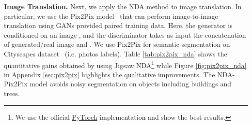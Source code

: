 \documentclass{article} \usepackage{iclr2021_conference,times}
\begin{document}
\textbf{Image Translation.} Next, we apply the NDA method to image translation. In particular, we use the Pix2Pix model~\citep{isola2017image} that can perform image-to-image translation using GANs provided paired training data. Here, the generator is conditioned on an image , and the discriminator takes as input the concatenation of generated/real image and .
We use Pix2Pix for semantic segmentation on Cityscapes dataset~\citep{cordts2016cityscapes} (i.e. photos  labels). Table \ref{tab:pix2pix_nda} shows the quantitative gains obtained by using Jigsaw NDA\footnote{We use the official \href{https://github.com/junyanz/pytorch-CycleGAN-and-pix2pix}{PyTorch} implementation and show the best results. } 
while Figure \ref{fig:pix2pix_nda} in Appendix \ref{sec:pix2pix} highlights the qualitative improvements. The NDA-Pix2Pix model avoids noisy segmentation on objects including buildings and trees.

\begin{comment}
\begin{figure}[!h]
    \begin{minipage}{0.5\hsize}
\texttt{[image: sections/images/pix2pix.png]}
  \captionof{figure}{Qualitative results on Cityscapes.}
  \label{fig:pix2pix_nda}
\end{minipage}
    \hfill
\begin{minipage}{0.48\hsize}
\resizebox{\textwidth}{!}{
\begin{tabular}{llll}
    \toprule
    \textbf{Metric} & \textbf{Pp. acc.} & \textbf{Pc. acc.} & \textbf{mIOU}\\
    \midrule
    \begin{tabular}[c]{@{}c@{}}Pix2Pix \\ (cGAN)\end{tabular} & 0.80 & 0.24 & 0.27 \\
    \begin{tabular}[c]{@{}l@{}}NDA-Pix2Pix \\ (cGAN)\end{tabular} & \textbf{0.84} & \textbf{0.34} & \textbf{0.28}  \\
    \midrule
   \begin{tabular}[c]{@{}l@{}}Pix2Pix \\ (L1+cGAN)\end{tabular} &
    0.72 & 0.23 & 0.18\\
    \begin{tabular}[c]{@{}l@{}}NDA-Pix2Pix \\ (L1+cGAN)\end{tabular} &
    \textbf{0.75} & \textbf{0.28} & \textbf{0.22}\\
    \bottomrule
  \end{tabular}}
\captionof{table}{Quantitative results on CityScapes, using per pixel (Pp.), per class (Pc.) accuracies and mean Intersection over Union (mIOU)}
    \label{tab:pix2pix_nda}
\end{minipage}
\end{figure}
\end{comment}
\end{document}
